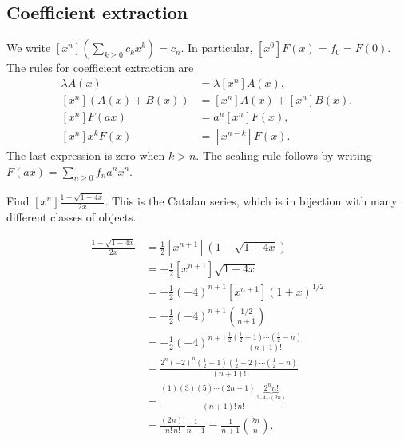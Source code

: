 \subsection{Coefficient extraction}
We write $\displaystyle[x^n]\left(\sum_{k\ge0}c_kx^k\right)=c_n$. In particular, $[x^0]F(x)=f_0=F(0)$.
The rules for coefficient extraction are
\begin{align*}
[x^n]\lambda A(x)&=\lambda[x^n]A(x),\\
[x^n](A(x)+B(x))&=[x^n]A(x)+[x^n]B(x),\\
[x^n]F(ax)&=a^n[x^n]F(x),\\
[x^n]x^kF(x)&=[x^{n-k}]F(x).
\end{align*}
The last expression is zero when $k>n$. The scaling rule follows by writing $\displaystyle F(ax)=\sum_{n\ge0}f_na^nx^n$.
\begin{example}
Find $\displaystyle[x^n]\frac{1-\sqrt{1-4x}}{2x}$.
This is the Catalan series, which is in bijection with many different classes of objects.
\par\medskip
\begin{align*}
[x^n]\frac{1-\sqrt{1-4x}}{2x}
&=\frac12[x^{n+1}](1-\sqrt{1-4x})\\
&=-\frac12[x^{n+1}]\sqrt{1-4x}\\
&=-\frac12(-4)^{n+1}[x^{n+1}](1+x)^{1/2}\\
&=-\frac12(-4)^{n+1}\binom{1/2}{n+1}\\
&=-\frac12(-4)^{n+1}
\frac{\frac12(\frac12-1)\cdots(\frac12-n)}{(n+1)!}\\
&=\frac{2^n(-2)^n(\frac12-1)(\frac12-2)\cdots(\frac12-n)}{(n+1)!}\\
&=\frac{(1)(3)(5)\cdots(2n-1)\,\underbrace{2^n n!}_{2\cdot4\cdots(2n)}}{(n+1)!\,n!}\\
&=\frac{(2n)!}{n!\,n!}\frac1{n+1}
=\frac1{n+1}\binom{2n}{n}.
\end{align*}
\end{example}
